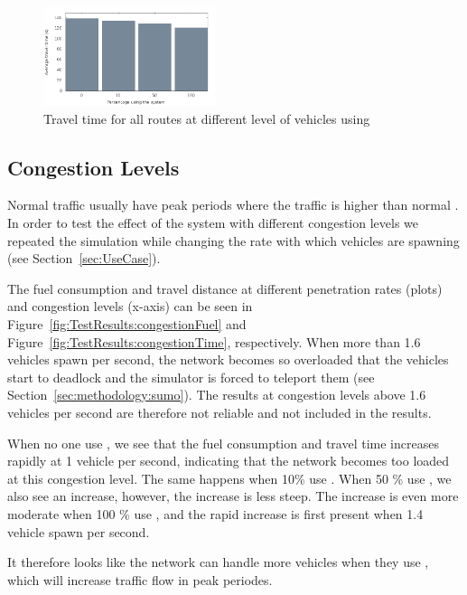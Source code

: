 \begin{figure}[htb]
\includegraphics[width=0.45\textwidth]{../images/tp0c0_8/combinedTime.png}
\caption{Travel time for all routes at different level of vehicles using \tech}
\label{fig:TestResults:combinedTime}
\end{figure}

\subsection{Congestion Levels}
Normal traffic usually have peak periods where the traffic is higher than normal \cite{Vejdir}. 
In order to test the effect of the system with different congestion levels we repeated the simulation while changing the rate with which vehicles are spawning (see Section~\ref{sec:UseCase}). 

The fuel consumption and travel distance at different penetration rates (plots) and congestion levels (x-axis) can be seen in Figure~\ref{fig:TestResults:congestionFuel} and Figure~\ref{fig:TestResults:congestionTime}, respectively. 
When more than 1.6 vehicles spawn per second, the network becomes so overloaded that the vehicles start to deadlock and the simulator is forced to teleport them (see Section~\ref{sec:methodology:sumo}).
The results at congestion levels above 1.6 vehicles per second are therefore not reliable and not included in the results.

When no one use \tech, we see that the fuel consumption and travel time increases rapidly at 1 vehicle per second, indicating that the network becomes too loaded at this congestion level. 
The same happens when 10\% use \tech. 
When 50 \% use \tech, we also see an increase, however, the increase is less steep.
The increase is even more moderate when 100 \% use \tech, and the rapid increase is first present when 1.4 vehicle spawn per second.

It therefore looks like the network can handle more vehicles when they use \tech, which will increase traffic flow in peak periodes.

